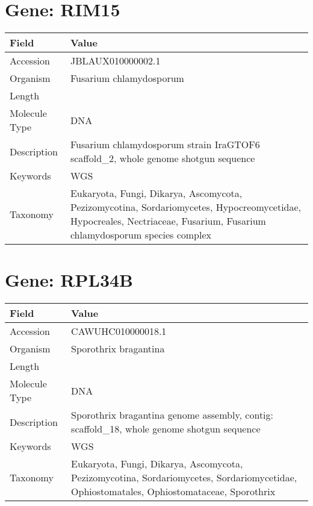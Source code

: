 \documentclass[10pt]{article}
\begin{document}
\section*{Gene: RIM15}
{\footnotesize
\begin{longtable}{>{\raggedright\arraybackslash}p{4.5cm} >{\raggedright\arraybackslash}p{11.5cm}}
\textbf{Field} & \textbf{Value} \\
\hline
Accession & JBLAUX010000002.1 \\
Organism & Fusarium chlamydosporum \\
Length & 4416796 \\
Molecule Type & DNA \\
Description & Fusarium chlamydosporum strain IraGTOF6 scaffold\_2, whole genome shotgun sequence \\
Keywords & WGS \\
Taxonomy & Eukaryota, Fungi, Dikarya, Ascomycota, Pezizomycotina, Sordariomycetes, Hypocreomycetidae, Hypocreales, Nectriaceae, Fusarium, Fusarium chlamydosporum species complex \\
\end{longtable}
}


\section*{Gene: RPL34B}
{\footnotesize
\begin{longtable}{>{\raggedright\arraybackslash}p{4.5cm} >{\raggedright\arraybackslash}p{11.5cm}}
\textbf{Field} & \textbf{Value} \\
\hline
Accession & CAWUHC010000018.1 \\
Organism & Sporothrix bragantina \\
Length & 445038 \\
Molecule Type & DNA \\
Description & Sporothrix bragantina genome assembly, contig: scaffold\_18, whole genome shotgun sequence \\
Keywords & WGS \\
Taxonomy & Eukaryota, Fungi, Dikarya, Ascomycota, Pezizomycotina, Sordariomycetes, Sordariomycetidae, Ophiostomatales, Ophiostomataceae, Sporothrix \\
\end{longtable}
}
\end{document}
